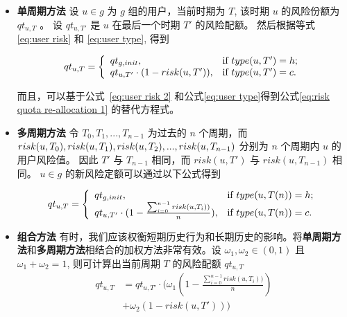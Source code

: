 \begin{itemize}
	\item \textbf{单周期方法} 设 $u \in g$ 为 $g$ 组的用户，当前时期为 $T$, 该时期 $u$ 的风险份额为 $qt_{u,T}$ 。 设 $qt_{u,T'}$ 是 $u$ 在最后一个时期 $T'$ 的风险配额。
	然后根据等式 \ref{eq:user risk} 和 \ref{eq:user type}, 得到
	\begin{small}
		\begin{equation}\label{eq:risk quota re-allocation 1}
		qt_{u,T}=
		\left\{
		\begin{array}{ll}
		qt_{g,init}, & \hbox{if $type(u,T')=h$;} \\
		qt_{u,T'}\cdot (1-risk(u,T')), & \hbox{if $type(u,T')=c$.} \\
		\end{array}
		\right.
		\end{equation}
	\end{small}
	而且，可以基于公式~\ref{eq:user risk 2} 和公式\ref{eq:user type}得到公式\ref{eq:risk quota re-allocation 1} 的替代方程式。
	\item \textbf{多周期方法} 令 $T_0,T_1,...,T_{n-1}$ 为过去的 $n$ 个周期，而 $risk(u,T_0),risk(u,T_1),risk(u,T_2),..., \\risk(u,T_{n-1})$ 分别为 $n$ 个周期内 $u$ 的用户风险值。 因此 $T'$ 与 $T_{n-1}$ 相同，而 $risk(u,T')$ 与 $risk(u,T_{n-1})$ 相同。 $u \in g$ 的新风险定额可以通过以下公式得到
	
	\begin{equation}\label{eq:risk quota re-allocation 2}
		qt_{u,T}=
		\left\{
		\begin{array}{ll}
		qt_{g,init}, & \hbox{if $type(u,T(n))=h$;} \\
		qt_{u,T'}\cdot (1-\frac{ \sum _{i=0} ^ {n-1}risk(u,T_i))}{n}), & \hbox{if $type(u,T(n))=c$.} \\
		\end{array}
		\right.
		\end{equation}
	
	\item \textbf{组合方法} 有时，我们应该权衡短期历史行为和长期历史的影响。将\textbf{单周期方法}和\textbf{多周期方法}相结合的加权方法非常有效。设 $\omega_1, \omega_2 \in (0,1)$ 且 $\omega_1+ \omega_2 =1$, 则可计算出当前周期 $T$ 的风险配额 $qt_{u,T}$ 
	\begin{equation}\label{eq:risk quota re-allocation 3}
	\begin{aligned}
	qt_{u,T} &= qt_{u,T'}\cdot (\omega_1(1-\frac{ \sum _{i=0} ^ {n-1}risk(u,T_i))}{n}) \\
	&+ \omega_2(1-risk(u,T')))
	\end{aligned}
	\end{equation}
\end{itemize}

